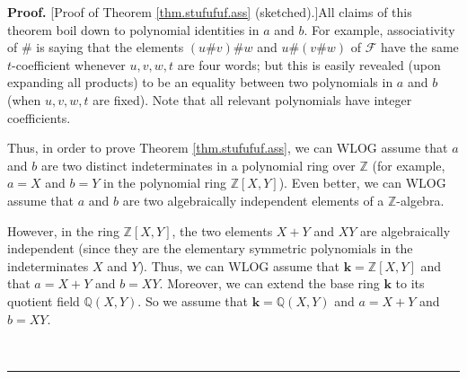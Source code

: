 \documentclass[numbers=enddot,12pt,final,onecolumn,notitlepage]{scrartcl}%
\theoremstyle{definition}
\newenvironment{proof}[1][Proof]{\noindent\textbf{#1.} }{\ \rule{0.5em}{0.5em}}
\begin{document}
\begin{proof}
[Proof of Theorem \ref{thm.stufufuf.ass} (sketched).]All claims of this
theorem boil down to polynomial identities in $a$ and $b$. For example,
associativity of $\#$ is saying that the elements $\left(  u\#v\right)  \#w$
and $u\#\left(  v\#w\right)  $ of $\mathcal{F}$ have the same $t$-coefficient
whenever $u,v,w,t$ are four words; but this is easily revealed (upon expanding
all products) to be an equality between two polynomials in $a$ and $b$ (when
$u,v,w,t$ are fixed). Note that all relevant polynomials have integer coefficients.

Thus, in order to prove Theorem \ref{thm.stufufuf.ass}, we can WLOG assume
that $a$ and $b$ are two distinct indeterminates in a polynomial ring over
$\mathbb{Z}$ (for example, $a=X$ and $b=Y$ in the polynomial ring
$\mathbb{Z}\left[  X,Y\right]  $). Even better, we can WLOG assume that $a$
and $b$ are two algebraically independent elements of a $\mathbb{Z}$-algebra.

However, in the ring $\mathbb{Z}\left[  X,Y\right]  $, the two elements $X+Y$
and $XY$ are algebraically independent (since they are the elementary
symmetric polynomials in the indeterminates $X$ and $Y$). Thus, we can WLOG
assume that $\mathbf{k}=\mathbb{Z}\left[  X,Y\right]  $ and that $a=X+Y$ and
$b=XY$. Moreover, we can extend the base ring $\mathbf{k}$ to its quotient
field $\mathbb{Q}\left(  X,Y\right)  $. So we assume that $\mathbf{k}%
=\mathbb{Q}\left(  X,Y\right)  $ and $a=X+Y$ and $b=XY$.


\end{proof}
\end{document}
